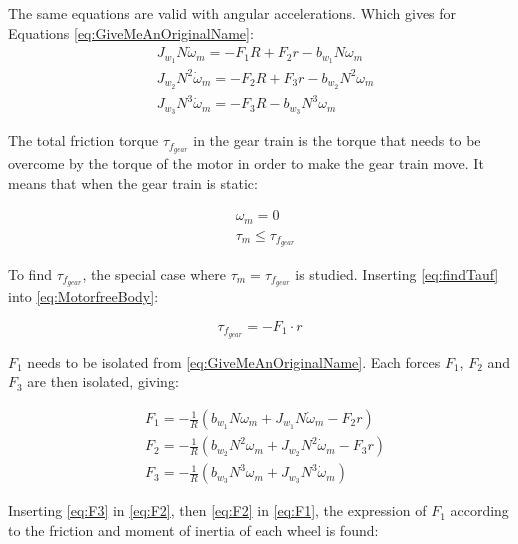 The same equations are valid with angular accelerations.
Which gives for Equations \ref{eq:GiveMeAnOriginalName}:
\begin{subequations} 
	\begin{flalign}  
		&J_{w_1}N\dot{\omega}_m = -F_1R + F_2r -b_{w_1}N\omega_m \\ 
		&J_{w_2}N^2\dot{\omega}_m = -F_2R + F_3r -b_{w_2}N^2\omega_m  \\ 
		&J_{w_3}N^3\dot{\omega}_m = -F_3R - b_{w_3}N^3\omega_m 
	\end{flalign}
\end{subequations}

The total friction torque $\tau_{f_{gear}}$ in the gear train is the torque that needs to be overcome by the torque of the motor in order to make the gear train move. It means that when the gear train is static:

\begin{subequations} \label{eq:findTauf}
	\begin{flalign}
		&\omega_m = 0\\
		&\tau_m \leqslant \tau_{f_{gear}}
	\end{flalign}
\end{subequations}

To find $\tau_{f_{gear}}$, the special case where $\tau_m = \tau_{f_{gear}}$ is studied. Inserting \autoref{eq:findTauf} into \autoref{eq:MotorfreeBody}:

\begin{equation} 
		\tau_{f_{gear}} = -F_1 \cdot r
		\label{eq:TaufF1r}
\end{equation}

$F_1$ needs to be isolated from \autoref{eq:GiveMeAnOriginalName}. Each forces $F_1$, $F_2$ and $F_3$ are then isolated, giving: 

\begin{subequations} 
	\begin{flalign}
		&F_1 = -\frac{1}{R} (b_{w_1}N\omega_m + J_{w_1}N\dot{\omega}_m - F_2r) 	\label{eq:F1}\\ 
		&F_2 = -\frac{1}{R} (b_{w_2}N^2\omega_m +  J_{w_2}N^2\dot{\omega}_m - F_3r)	\label{eq:F2}\\
		&F_3 = -\frac{1}{R} (b_{w_3}N^3\omega_m + J_{w_3}N^3\dot{\omega}_m)			\label{eq:F3}
	\end{flalign}
\end{subequations}

Inserting \autoref{eq:F3} in \autoref{eq:F2}, then \autoref{eq:F2} in \autoref{eq:F1}, the expression of $F_1$ according to the friction and moment of inertia of each wheel is found:

